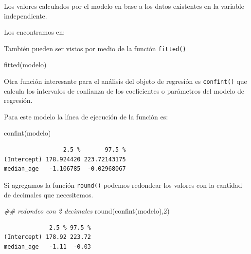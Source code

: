 \documentclass[
  letterpaper,
  DIV=11,
  numbers=noendperiod]{scrartcl}
\newenvironment{Shaded}{\begin{snugshade}}{\end{snugshade}}
\newcommand{\DecValTok}[1]{\textcolor[rgb]{0.68,0.00,0.00}{#1}}
\newcommand{\DocumentationTok}[1]{\textcolor[rgb]{0.37,0.37,0.37}{\textit{#1}}}
\newcommand{\FunctionTok}[1]{\textcolor[rgb]{0.28,0.35,0.67}{#1}}
\newcommand{\NormalTok}[1]{\textcolor[rgb]{0.00,0.23,0.31}{#1}}
\newcommand{\SpecialCharTok}[1]{\textcolor[rgb]{0.37,0.37,0.37}{#1}}
\begin{document}
Los valores calculados por el modelo en base a los datos existentes en
la variable independiente.

Los encontramos en:

\begin{Shaded}
\end{Shaded}

También pueden ser vistos por medio de la función \texttt{fitted()}

\begin{Shaded}
\begin{Highlighting}[]
\FunctionTok{fitted}\NormalTok{(modelo)}
\end{Highlighting}
\end{Shaded}

Otra función interesante para el análisis del objeto de regresión es
\texttt{confint()} que calcula los intervalos de confianza de los
coeficientes o parámetros del modelo de regresión.

Para este modelo la línea de ejecución de la función es:

\begin{Shaded}
\begin{Highlighting}[]
\FunctionTok{confint}\NormalTok{(modelo)}
\end{Highlighting}
\end{Shaded}

\begin{verbatim}
                 2.5 %       97.5 %
(Intercept) 178.924420 223.72143175
median_age   -1.106785  -0.02968067
\end{verbatim}

Si agregamos la función \texttt{round()} podemos redondear los valores
con la cantidad de decimales que necesitemos.

\begin{Shaded}
\begin{Highlighting}[]
\DocumentationTok{\#\# redondeo con 2 decimales}
\FunctionTok{round}\NormalTok{(}\FunctionTok{confint}\NormalTok{(modelo),}\DecValTok{2}\NormalTok{)  }
\end{Highlighting}
\end{Shaded}

\begin{verbatim}
             2.5 % 97.5 %
(Intercept) 178.92 223.72
median_age   -1.11  -0.03
\end{verbatim}
\end{document}
